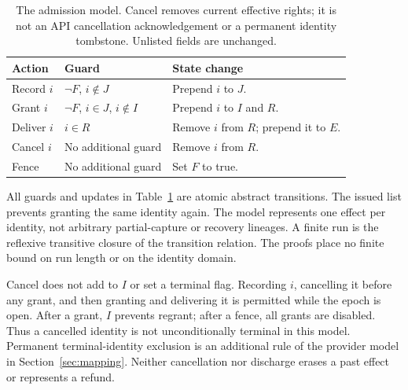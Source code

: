 \documentclass[11pt]{article}
\begin{document}
\begin{table}[ht]
\centering\small
\begin{tabularx}{\linewidth}{@{}l X X@{}}
\toprule
Action & Guard & State change \\
\midrule
Record $i$ & $\neg F$, $i\notin J$ & Prepend $i$ to $J$. \\
Grant $i$ & $\neg F$, $i\in J$, $i\notin I$ & Prepend $i$ to $I$ and $R$. \\
Deliver $i$ & $i\in R$ & Remove $i$ from $R$; prepend it to $E$. \\
Cancel $i$ & No additional guard & Remove $i$ from $R$. \\
Fence & No additional guard & Set $F$ to true. \\
\bottomrule
\end{tabularx}
\caption{The admission model. Cancel removes current effective rights; it is
not an API cancellation acknowledgement or a permanent identity tombstone.
Unlisted fields are unchanged.}
\label{tab:steps}
\end{table}

All guards and updates in Table~\ref{tab:steps} are atomic abstract transitions.
The issued list prevents granting the same identity again. The model represents
one effect per identity, not arbitrary partial-capture or recovery lineages.
A finite run is the reflexive transitive closure of the transition relation.
The proofs place no finite bound on run length or on the identity domain.

Cancel does not add to $I$ or set a terminal flag. Recording $i$, cancelling it
before any grant, and then granting and delivering it is permitted while the
epoch is open. After a grant, $I$ prevents regrant; after a fence, all grants
are disabled. Thus a cancelled identity is not unconditionally terminal in
this model. Permanent terminal-identity exclusion is an additional rule of
the provider model in Section~\ref{sec:mapping}. Neither cancellation nor
discharge erases a past effect or represents a refund.
\end{document}
